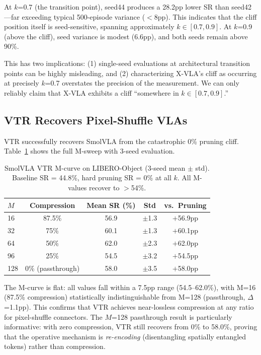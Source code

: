 \documentclass[letterpaper]{article}
\begin{document}
At $k$=0.7 (the transition point), seed44 produces a 28.2pp lower SR than seed42---far exceeding typical 500-episode variance ($<$8pp).
This indicates that the cliff position itself is seed-sensitive, spanning approximately $k \in [0.7, 0.9]$.
At $k$=0.9 (above the cliff), seed variance is modest (6.6pp), and both seeds remain above 90\%.

This has two implications: (1) single-seed evaluations at architectural transition points can be highly misleading, and (2) characterizing X-VLA's cliff as occurring at precisely $k$=0.7 overstates the precision of the measurement.
We can only reliably claim that X-VLA exhibits a cliff ``somewhere in $k \in [0.7, 0.9]$.''

\subsection{VTR Recovers Pixel-Shuffle VLAs}
\label{sec:vtr_results}

VTR successfully recovers SmolVLA from the catastrophic 0\% pruning cliff.
Table~\ref{tab:vtr_mcurve} shows the full M-sweep with 3-seed evaluation.

\begin{table}[h]
\centering
\caption{SmolVLA VTR M-curve on LIBERO-Object (3-seed mean $\pm$ std). Baseline SR = 44.8\%, hard pruning SR = 0\% at all $k$. All M-values recover to $>$54\%.}
\label{tab:vtr_mcurve}
\begin{tabular}{lcccc}
\toprule
\textbf{$M$} & \textbf{Compression} & \textbf{Mean SR (\%)} & \textbf{Std} & \textbf{vs.\ Pruning} \\
\midrule
16 & 87.5\% & 56.9 & $\pm$1.3 & $+$56.9pp \\
32 & 75\% & 60.1 & $\pm$1.3 & $+$60.1pp \\
64 & 50\% & 62.0 & $\pm$2.3 & $+$62.0pp \\
96 & 25\% & 54.5 & $\pm$3.2 & $+$54.5pp \\
128 & 0\% (passthrough) & 58.0 & $\pm$3.5 & $+$58.0pp \\
\bottomrule
\end{tabular}
\end{table}

The M-curve is flat: all values fall within a 7.5pp range (54.5--62.0\%), with M=16 (87.5\% compression) statistically indistinguishable from M=128 (passthrough, $\Delta$=1.1pp).
This confirms that VTR achieves near-lossless compression at any ratio for pixel-shuffle connectors.
The $M$=128 passthrough result is particularly informative: with zero compression, VTR still recovers from 0\% to 58.0\%, proving that the operative mechanism is \emph{re-encoding} (disentangling spatially entangled tokens) rather than compression.
\end{document}
